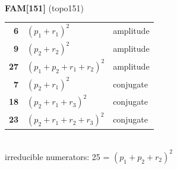 \documentclass[10pt]{article}
\begin{document}
\begin{minipage}[t]{0.48\textwidth}
{}\\[2mm]\textbf{FAM[151]} (topo151)\\[2pt]{\footnotesize\begin{tabular}{@{}r@{\ \ }l@{\ \ }l@{}}\textbf{6} & $(p_1+r_1)^2$ & amplitude\\
\textbf{9} & $(p_2+r_2)^2$ & amplitude\\
\textbf{27} & $(p_1+p_2+r_1+r_2)^2$ & amplitude\\
\textbf{7} & $(p_2+r_1)^2$ & conjugate\\
\textbf{18} & $(p_2+r_1+r_3)^2$ & conjugate\\
\textbf{23} & $(p_2+r_1+r_2+r_3)^2$ & conjugate\\\end{tabular}}\\[2pt]{\scriptsize irreducible numerators: 25 = $(p_1+p_2+r_2)^2$}\end{minipage}

\bigskip
\end{document}
